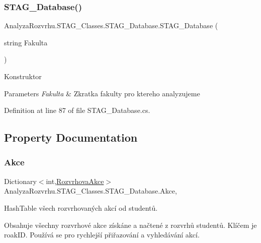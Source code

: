 \subsubsection{\texorpdfstring{S\+T\+A\+G\+\_\+\+Database()}{STAG\_Database()}}
{\footnotesize\ttfamily Analyza\+Rozvrhu.\+S\+T\+A\+G\+\_\+\+Classes.\+S\+T\+A\+G\+\_\+\+Database.\+S\+T\+A\+G\+\_\+\+Database (\begin{DoxyParamCaption}\item[{string}]{Fakulta }\end{DoxyParamCaption})}



Konstruktor 


\begin{DoxyParams}{Parameters}
{\em Fakulta} & Zkratka fakulty pro ktereho analyzujeme\\
\hline
\end{DoxyParams}


Definition at line 87 of file S\+T\+A\+G\+\_\+\+Database.\+cs.



\subsection{Property Documentation}
\mbox{\label{class_analyza_rozvrhu_1_1_s_t_a_g___classes_1_1_s_t_a_g___database_a8f2345d702674f097b30b96a2b5bed3e}} 
\subsubsection{\texorpdfstring{Akce}{Akce}}
{\footnotesize\ttfamily Dictionary$<$int,\hyperlink{class_analyza_rozvrhu_1_1_s_t_a_g___classes_1_1_rozvrhova_akce}{Rozvrhova\+Akce}$>$ Analyza\+Rozvrhu.\+S\+T\+A\+G\+\_\+\+Classes.\+S\+T\+A\+G\+\_\+\+Database.\+Akce\hspace{0.3cm}{\ttfamily [get]}, {\ttfamily [set]}}



Hash\+Table všech rozvrhovaných akcí od studentů. 

Obsahuje všechny rozvrhové akce získáne a načtené z rozvrhů studentů. Klíčem je roak\+ID. Používá se pro rychlejší přiřazování a vyhledávání akcí.

